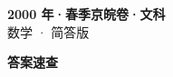 \documentclass[zihao=-4, a4paper]{ctexart}
\begin{document}
\begin{center}
  {\Large\bfseries 2000 年·春季京皖卷·文科}\\[4pt]
  {\large 数学 · 简答版}
\end{center}
\medskip
{}

\clearpage
{}
\begin{center}{\Large\bfseries 答案速查}\end{center}
\medskip

\end{document}
